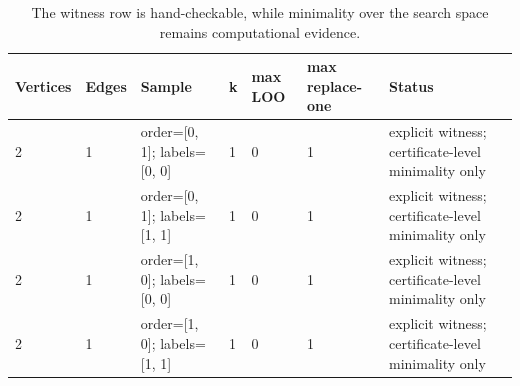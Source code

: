 \begin{table}[t]
\centering
\small
\begin{tabular}{lllllll}
\toprule
Vertices & Edges & Sample & k & max LOO & max replace-one & Status \\
\midrule
2 & 1 & order=[0, 1]; labels=[0, 0] & 1 & 0 & 1 & explicit witness; certificate-level minimality only \\
2 & 1 & order=[0, 1]; labels=[1, 1] & 1 & 0 & 1 & explicit witness; certificate-level minimality only \\
2 & 1 & order=[1, 0]; labels=[0, 0] & 1 & 0 & 1 & explicit witness; certificate-level minimality only \\
2 & 1 & order=[1, 0]; labels=[1, 1] & 1 & 0 & 1 & explicit witness; certificate-level minimality only \\
\bottomrule
\end{tabular}
\caption*{\footnotesize The witness row is hand-checkable, while minimality over the search space remains computational evidence.}
\end{table}
